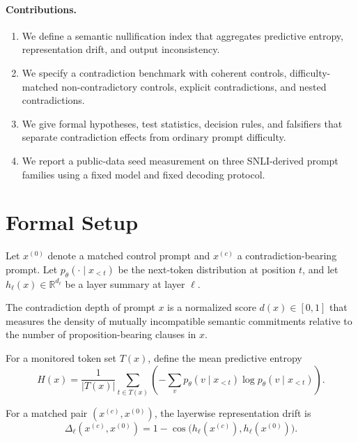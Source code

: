 \documentclass{svjour3}
\begin{document}
\paragraph{Contributions.}
\begin{enumerate}[leftmargin=*]
\item We define a semantic nullification index that aggregates predictive entropy, representation drift, and output inconsistency.
\item We specify a contradiction benchmark with coherent controls, difficulty-matched non-contradictory controls, explicit contradictions, and nested contradictions.
\item We give formal hypotheses, test statistics, decision rules, and falsifiers that separate contradiction effects from ordinary prompt difficulty.
\item We report a public-data seed measurement on three SNLI-derived prompt families using a fixed model and fixed decoding protocol.
\end{enumerate}

\section{Formal Setup}
Let $x^{(0)}$ denote a matched control prompt and $x^{(c)}$ a contradiction-bearing prompt. Let $p_\theta(\cdot \mid x_{<t})$ be the next-token distribution at position $t$, and let $h_\ell(x)\in\mathbb{R}^{d_\ell}$ be a layer summary at layer $\ell$.

\begin{definition}
The contradiction depth of prompt $x$ is a normalized score $d(x)\in[0,1]$ that measures the density of mutually incompatible semantic commitments relative to the number of proposition-bearing clauses in $x$.
\end{definition}

\begin{definition}
For a monitored token set $T(x)$, define the mean predictive entropy
\[
H(x)=\frac{1}{|T(x)|}\sum_{t\in T(x)}\left(-\sum_v p_\theta(v\mid x_{<t})\log p_\theta(v\mid x_{<t})\right).
\]
\end{definition}

\begin{definition}
For a matched pair $(x^{(c)},x^{(0)})$, the layerwise representation drift is
\[
\Delta_\ell(x^{(c)},x^{(0)})=1-\cos\!\big(h_\ell(x^{(c)}),h_\ell(x^{(0)})\big).
\]
\end{definition}
\end{document}
